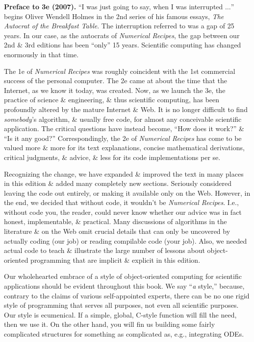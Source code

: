 \documentclass{article}
\begin{document}
\begin{enumerate}
	{\bf Preface to 3e (2007).} ``I was just going to say, when I was interrupted $\ldots$'' begins {\sc Oliver Wendell Holmes} in the 2nd series of his famous essays, {\it The Autocrat of the Breakfast Table}. The interruption referred to was a gap of 25 years. In our case, as the autocrats of {\it Numerical Recipes}, the gap between our 2nd \& 3rd editions has been ``only'' 15 years. Scientific computing has changed enormously in that time.
	
	The 1e of {\it Numerical Recipes} was roughly coincident with the 1st commercial success of the personal computer. The 2e came at about the time that the Internet, as we know it today, was created. Now, as we launch the 3e, the practice of science \& engineering, \& thus scientific computing, has been profoundly altered by the mature Internet \& Web. It is no longer difficult to find {\it somebody}'s algorithm, \& usually free code, for almost any conceivable scientific application. The critical questions have instead become, ``How does it work?'' \& ``Is it any good?'' Correspondingly, the 2e of {\it Numerical Recipes} has come to be valued more \& more for its text explanations, concise mathematical derivations, critical judgments, \& advice, \& less for its code implementations per se.
	
	Recognizing the change, we have expanded \& improved the text in many places in this edition \& added many completely new sections. Seriously considered leaving the code out entirely, or making it available only on the Web. However, in the end, we decided that without code, it wouldn't be {\it Numerical Recipes}. I.e., without code you, the reader, could never know whether our advice was in fact honest, implementable, \& practical. Many discussions of algorithms in the literature \& on the Web omit crucial details that can only be uncovered by actually coding (our job) or reading compilable code (your job). Also, we needed actual code to teach \& illustrate the large number of lessons about object-oriented programming that are implicit \& explicit in this edition.
	
	Our wholehearted embrace of a style of object-oriented computing for scientific applications should be evident throughout this book. We say ``{\it a} style,'' because, contrary to the claims of various self-appointed experts, there can be no one rigid style of programming that serves all purposes, not even all scientific purposes. Our style is ecumenical. If a simple, global, C-style function will fill the need, then we use it. On the other hand, you will fin us building some fairly complicated structures for something as complicated as, e.g., integrating ODEs.
	

\end{enumerate}
\end{document}
